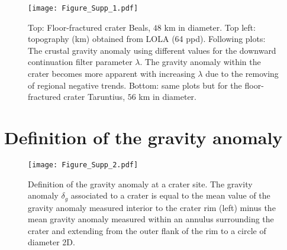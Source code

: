 \begin{figure}[h!]
  \graphicspath{ {/Users/thorey/Documents/These/Projet/FFC/Gravi_GRAIL/Article/Papier/SOUMISSION_2_EPSL/} }
  \begin{center}
    \texttt{[image: Figure\_Supp\_1.pdf]}
    \caption{Top: Floor-fractured  crater Beals, $48$ km  in diameter.
      Top  left:   topography  (km)  obtained  from   LOLA  (64  ppd).
      Following  plots: The  crustal gravity  anomaly using  different
      values for the downward continuation filter parameter $\lambda$.
      The gravity anomaly within the crater becomes more apparent with
      increasing $\lambda$  due to  the removing of  regional negative
      trends.  Bottom:  same plots but for  the floor-fractured crater
      Taruntius, $56$ km in diameter.}
    \label{Figure_Supp_1}
  \end{center}
\end{figure}
\clearpage
\section{Definition of the gravity anomaly}

\begin{figure}[h!]
  \graphicspath{ {/Users/thorey/Documents/These/Projet/FFC/Gravi_GRAIL/Article/Papier/SOUMISSION_2_EPSL/} }
  \begin{center}
    \texttt{[image: Figure\_Supp\_2.pdf]}
    \caption{Definition of the  gravity anomaly at a  crater site. The
      gravity anomaly  $\delta_g$ associated to  a crater is  equal to
      the mean value  of the gravity anomaly measured  interior to the
      crater rim (left) minus the mean gravity anomaly measured within
      an annulus surrounding  the crater and extending  from the outer
      flank of the rim to a circle of diameter 2D.}
    \label{Figure_Supp_2}
  \end{center}
\end{figure}

